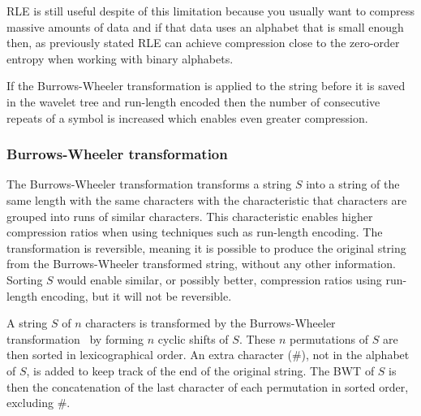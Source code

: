 RLE is still useful despite of this limitation because you usually want to compress massive amounts of data and if that data uses an alphabet that is small enough then, as previously stated RLE can achieve compression close to the zero-order entropy when working with binary alphabets.

If the Burrows-Wheeler transformation is applied to the string before it is saved in the wavelet tree and run-length encoded then the number of consecutive repeats of a symbol is increased which enables even greater compression.

\subsubsection{Burrows-Wheeler transformation}
The Burrows-Wheeler transformation transforms a string $S$ into a string of the same length with the same characters with the characteristic that characters are grouped into runs of similar characters.
This characteristic enables higher compression ratios when using techniques such as run-length encoding.
The transformation is reversible, meaning it is possible to produce the original string from the Burrows-Wheeler transformed string, without any other information.
Sorting $S$ would enable similar, or possibly better, compression ratios using run-length encoding, but it will not be reversible.

A string $S$ of $n$ characters is transformed by the Burrows-Wheeler transformation~\citep{BWToriginalArticle} by forming $n$ cyclic shifts of $S$. 
These $n$ permutations of $S$ are then sorted in lexicographical order.
An extra character (\#), not in the alphabet of $S$, is added to keep track of the end of the original string.
The BWT of $S$ is then the concatenation of the last character of each permutation in sorted order, excluding $\#$.


